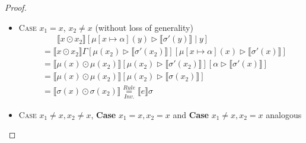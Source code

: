 \documentclass[twoside, english, final]{sdqthesis}
\newcommand{\bbracket}[1]{\llbracket #1 \rrbracket}
\newcommand{\tr}[0]{\triangleright}
\newtheorem{lemma}[theorem]{Lemma}
\theoremstyle{definition}
\begin{document}
\begin{proof}
\begin{itemize}
\begin{itemize}
\begin{itemize}
\begin{itemize}
                \item \textsc{Case $x_1=x$, $x_2 \neq x$} (without loss of generality)
                \begin{align*}
                  &\phantom{=}\ \ \bbracket{x \odot x_2}[\mu[x\mapsto \alpha](y) \tr \bbracket{\sigma'(y)} \mid y]
                  \\ &=\bbracket{x \odot x_2}\Gamma[\mu(x_2)\tr \bbracket{\sigma'(x_2)}][\mu[x \mapsto \alpha](x) \tr \bbracket{\sigma'(x)}]
                  \\ &=\bbracket{\mu(x) \odot \mu(x_2)}[\mu(x_2)\tr \bbracket{\sigma'(x_2)}][\alpha \tr \bbracket{\sigma'(x)}]
                  \\ &=\bbracket{\mu(x) \odot \mu(x_2)}[\mu(x_2)\tr \bbracket{\sigma(x_2)}]
                  \\ &=\bbracket{\sigma(x) \odot \sigma(x_2)} \underset{Inv.}{\overset{Rule}{=}} \bbracket{e}\sigma
                \end{align*}
                \item \textsc{Case} $x_1\neq x, x_2 \neq x$, \textbf{Case} $x_1 = x, x_2 = x$ and \textbf{Case} $x_1 \neq x, x_2 = x$ analogous
              \end{itemize}
          \end{itemize}
      \end{itemize}
  \end{itemize}
\end{proof}


\end{document}
